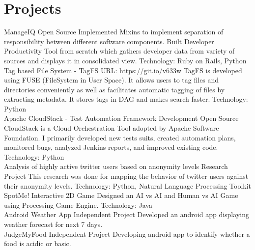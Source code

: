 \documentclass[]{friggeri-cv}
\begin{document}
\section{Projects}
\begin{entrylist}
\entry
    {ManageIQ }
    {Open Source}
    {Implemented Mixins to implement separation of responsibility between different software components. Built Developer Productivity Tool from scratch which gathers developer data from variety of sources and displays it in consolidated view. Technology: Ruby on Rails, Python\\}
  \entry
    {Tag based File System - TagFS }
    {URL: https://git.io/v633w}
    {TagFS is developed using FUSE (FileSystem in User Space). It allows users to tag files and directories conveniently as well as facilitates automatic tagging of files by extracting metadata. It stores tags in DAG and makes search faster. Technology: Python\\}
    \entry
    {Apache CloudStack - Test Automation Framework Development }
    {Open Source}
    {CloudStack is a Cloud Orchestration Tool adopted by Apache Software Foundation. I primarily developed new tests suits, created automation plans, monitored bugs, analyzed Jenkins reports, and improved existing code. Technology: Python\\}
    \entry
    {Analysis of highly active twitter users based on anonymity levels}
    {Research Project}
    {This research was done for mapping the behavior of twitter users against their anonymity levels. Technology: Python, Natural Language Processing Toolkit\\}
    \entry
    {SpotMe! Interactive 2D Game}
    {}
    {Designed an AI vs AI and Human vs AI Game using Processing Game Engine. Technology: Java\\}
    \entry
    {Android Weather App}
    {Independent Project}
    {Developed an android app displaying weather forecast for next 7 days.\\}
    \entry
    {JudgeMyFood}
    {Independent Project}
    {Developing android app to identify whether a food is acidic or basic.\\}
\end{entrylist}
\end{document}
